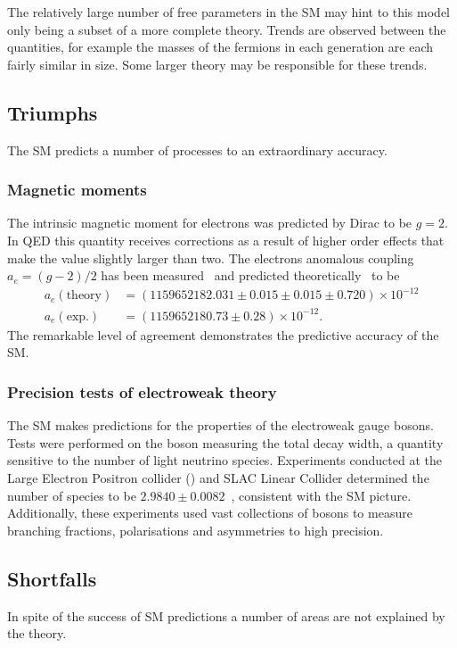 The relatively large number of free parameters in the SM may hint to this model only being a subset of a more complete theory. Trends are observed between the quantities, for example the masses of the fermions in each generation are each fairly similar in size. Some larger theory may be responsible for these trends.  

\subsection{Triumphs}
The SM predicts a number of processes to an extraordinary accuracy. 
\subsubsection{Magnetic moments}
The intrinsic magnetic moment for electrons was predicted by Dirac to be $g=2$. In QED this quantity receives corrections as a result of higher order effects that make the value slightly larger than two. The electrons anomalous coupling $a_{e} = (g-2)/2$ has been measured~\cite{PhysRevLett.100.120801} and predicted theoretically~\cite{PhysRevD.96.019901} to be 
\begin{equation}
\begin{split}
a_e(\text{theory}) & = (1159652182.031\pm0.015\pm0.015\pm0.720)\times10^{-12}\\
a_e(\text{exp.})   & = (1159652180.73\pm0.28)\times10^{-12}.
\end{split}
\end{equation}
The remarkable level of agreement demonstrates the predictive accuracy of the SM. 



\subsubsection{Precision tests of electroweak theory}

The SM makes predictions for the properties of the electroweak gauge bosons. Tests were performed on the \Z boson measuring the total decay width, a quantity sensitive to the number of light neutrino species. Experiments conducted at the Large Electron Positron collider (\lep) and SLAC Linear Collider determined the number of species to be $2.9840\pm0.0082$~\cite{2006257}, consistent with the SM picture.
Additionally, these experiments used vast collections of \Z bosons to measure branching fractions, polarisations and asymmetries to high precision.  

\subsection{Shortfalls}
In spite of the success of SM predictions a number of areas are not explained by the theory.  

